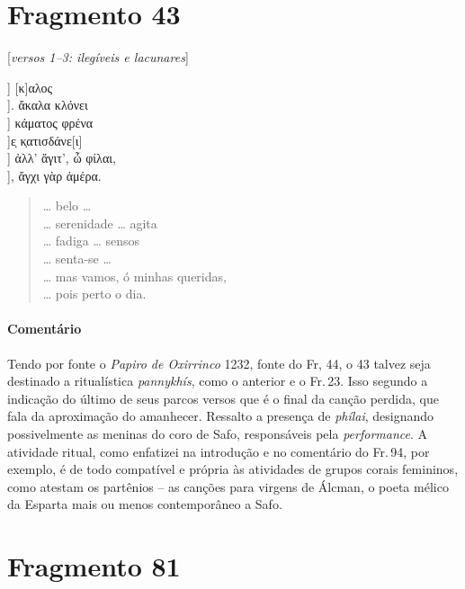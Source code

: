 {\pagebreak
\section{Fragmento 43} 

\begin{gkverse}
\textnormal{[\textit{versos 1--3: ilegíveis e lacunares}]}

] [κ]αλος\\
         ]. ἄκαλα κλόνει\\
         ] κάματος φρένα\\
       ]ε̣ κ̣ατισδάνε[ι]\\
       ] ἀλλ’ ἄγιτ’, ὦ φίλαι,\\
       ], ἄγχι γὰρ ἀμέρα.
\end{gkverse}

\begin{verse}
\ldots{} belo \ldots{}\\
\ldots{} serenidade \ldots{} agita\\
\ldots{} fadiga \ldots{} sensos\\
\ldots{} senta-se \ldots{}\\
\ldots{} mas vamos, ó minhas queridas,\\
\ldots{} pois perto o dia.
\end{verse}

\medskip

{\paragraph{Comentário} Tendo por fonte o \textit{Papiro de Oxirrinco} 1232, fonte do Fr, 44, o 43 talvez seja destinado a ritualística \textit{pannykhís}, como o anterior e o Fr.\,23. Isso segundo a indicação do último de seus parcos versos que é o final da canção perdida, que fala da aproximação do amanhecer. Ressalto a presença de \textit{phílai}, designando possivelmente as meninas do coro de Safo, responsáveis pela \textit{performance}. A atividade ritual, como enfatizei na introdução e no comentário do Fr.\,94, por exemplo, é de todo compatível e própria às atividades de grupos corais femininos, como atestam os partênios -- as canções para virgens de Álcman, o poeta mélico da Esparta mais ou menos contemporâneo a Safo.}


\pagebreak
\section{Fragmento 81}

}
